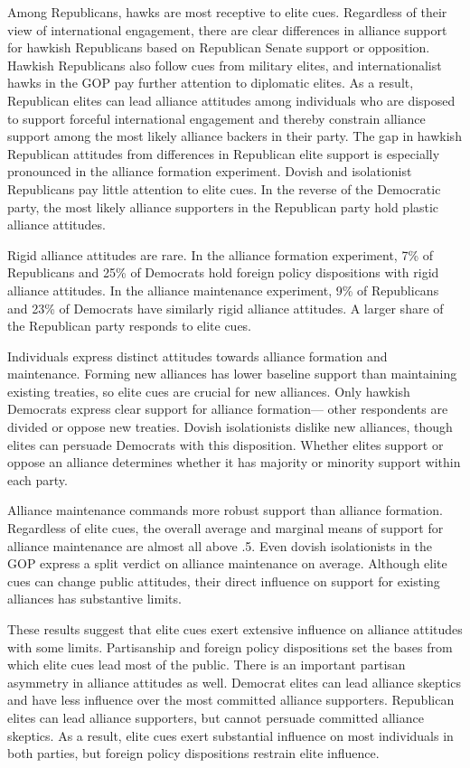 \documentclass[12pt]{article}
\begin{document}
Among Republicans, hawks are most receptive to elite cues. 
Regardless of their view of international engagement, there are clear differences in alliance support for hawkish Republicans based on Republican Senate support or opposition.
Hawkish Republicans also follow cues from military elites, and internationalist hawks in the GOP pay further attention to diplomatic elites. 
As a result, Republican elites can lead alliance attitudes among individuals who are disposed to support forceful international engagement and thereby constrain alliance support among the most likely alliance backers in their party. 
The gap in hawkish Republican attitudes from differences in Republican elite support is especially pronounced in the alliance formation experiment. 
Dovish and isolationist Republicans pay little attention to elite cues. 
In the reverse of the Democratic party, the most likely alliance supporters in the Republican party hold plastic alliance attitudes. 


Rigid alliance attitudes are rare. 
In the alliance formation experiment, 7\% of Republicans and 25\% of Democrats hold foreign policy dispositions with rigid alliance attitudes. 
In the alliance maintenance experiment, 9\% of Republicans and 23\% of Democrats have similarly rigid alliance attitudes.
A larger share of the Republican party responds to elite cues.


Individuals express distinct attitudes towards alliance formation and maintenance. 
Forming new alliances has lower baseline support than maintaining existing treaties, so elite cues are crucial for new alliances. 
Only hawkish Democrats express clear support for alliance formation--- other respondents are divided or oppose new treaties.
Dovish isolationists dislike new alliances, though elites can persuade Democrats with this disposition. 
Whether elites support or oppose an alliance determines whether it has majority or minority support within each party. 


Alliance maintenance commands more robust support than alliance formation. 
Regardless of elite cues, the overall average and marginal means of support for alliance maintenance are almost all above .5. 
Even dovish isolationists in the GOP express a split verdict on alliance maintenance on average.
Although elite cues can change public attitudes, their direct influence on support for existing alliances has substantive limits.


These results suggest that elite cues exert extensive influence on alliance attitudes with some limits.
Partisanship and foreign policy dispositions set the bases from which elite cues lead most of the public. 
There is an important partisan asymmetry in alliance attitudes as well. 
Democrat elites can lead alliance skeptics and have less influence over the most committed alliance supporters. 
Republican elites can lead alliance supporters, but cannot persuade committed alliance skeptics. 
As a result, elite cues exert substantial influence on most individuals in both parties, but foreign policy dispositions restrain elite influence. 
\end{document}

